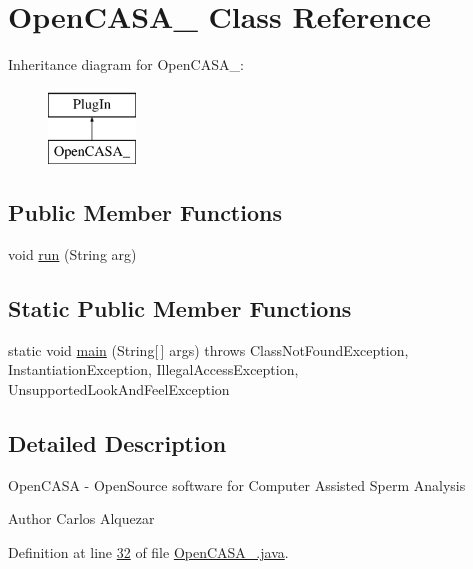 \hypertarget{class_open_c_a_s_a__}{}\section{Open\+C\+A\+S\+A\+\_\+ Class Reference}
\label{class_open_c_a_s_a__}
Inheritance diagram for Open\+C\+A\+S\+A\+\_\+\+:\begin{figure}[H]
\begin{center}
\leavevmode
\includegraphics[height=2.000000cm]{class_open_c_a_s_a__}
\end{center}
\end{figure}
\subsection*{Public Member Functions}
\begin{DoxyCompactItemize}
\item 
void \hyperlink{class_open_c_a_s_a___a4d9c6a01d97384c0df54710b80fc88fc}{run} (String arg)
\end{DoxyCompactItemize}
\subsection*{Static Public Member Functions}
\begin{DoxyCompactItemize}
\item 
static void \hyperlink{class_open_c_a_s_a___a8b260eecbaabcef8473fd87ada040682}{main} (String\mbox{[}$\,$\mbox{]} args)  throws Class\+Not\+Found\+Exception, Instantiation\+Exception, Illegal\+Access\+Exception, Unsupported\+Look\+And\+Feel\+Exception 
\end{DoxyCompactItemize}


\subsection{Detailed Description}
Open\+C\+A\+SA -\/ Open\+Source software for Computer Assisted Sperm Analysis

\begin{DoxyAuthor}{Author}
Carlos Alquezar 
\end{DoxyAuthor}


Definition at line \hyperlink{_open_c_a_s_a___8java_source_l00032}{32} of file \hyperlink{_open_c_a_s_a___8java_source}{Open\+C\+A\+S\+A\+\_\+.\+java}.



